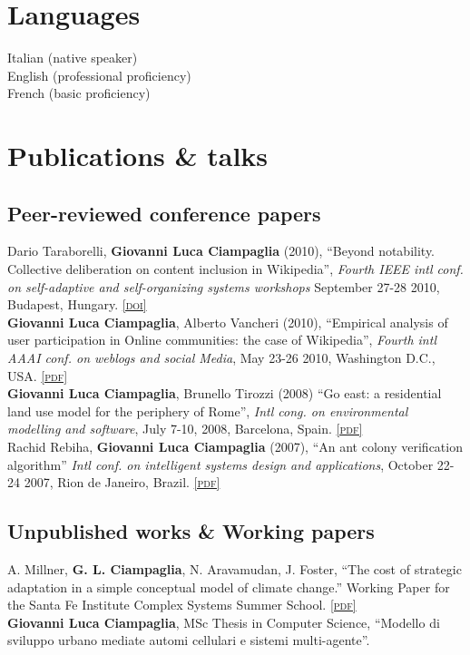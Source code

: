 \documentclass[10pt, a4paper]{article}
\newcommand{\pdf}[1]{\href{#1}{\scriptsize\textsc{[pdf]}}}
\newcommand{\doi}[1]{\href{#1}{\scriptsize\textsc{[doi]}}}
\newcommand{\years}[1]{\marginnote{\scriptsize #1}}
\begin{document}
\section*{Languages}
Italian (native speaker)\\
English (professional proficiency)\\
French (basic proficiency)

\section*{Publications \& talks}

\subsection*{Peer-reviewed conference papers}
\noindent
\years{2010b}Dario Taraborelli, \textbf{Giovanni Luca Ciampaglia} (2010), ``Beyond notability. Collective deliberation on content inclusion in Wikipedia'', \emph{Fourth IEEE intl conf. on self-adaptive and self-organizing systems workshops} September 27-28 2010, Budapest, Hungary. \doi{10.1109/SASOW.2010.26}\\
\years{2010a}\textbf{Giovanni Luca Ciampaglia}, Alberto Vancheri (2010), ``Empirical analysis of user participation in Online communities: the case of Wikipedia'', \emph{Fourth intl AAAI conf. on weblogs and social Media}, May 23-26 2010, Washington D.C., USA. \pdf{http://www.aaai.org/ocs/index.php/ICWSM/ICWSM10/paper/download/1517/1861}\\ 
\years{2008}\textbf{Giovanni Luca Ciampaglia}, Brunello Tirozzi (2008) ``Go east: a residential land use model for the periphery of Rome'', \emph{Intl cong. on environmental modelling and software}, July 7-10, 2008, Barcelona, Spain. \pdf{http://www.inf.usi.ch/phd/ciampaglia/papers/RomeModel2008.pdf}\\
\years{2007}Rachid Rebiha, \textbf{Giovanni Luca Ciampaglia} (2007), ``An ant colony verification algorithm'' \emph{Intl conf. on intelligent systems design and applications}, October 22-24 2007, Rion de Janeiro, Brazil. \pdf{http://www.inf.usi.ch/phd/ciampaglia/papers/RebihaACOVerification07.pdf}\\

\subsection*{Unpublished works \& Working papers}
\noindent
\years{2008}A. Millner, \textbf{G. L. Ciampaglia}, N. Aravamudan, J. Foster, ``The cost of strategic adaptation in a simple conceptual model of climate change.'' Working Paper for the Santa Fe Institute Complex Systems Summer School. \pdf{http://www.santafe.edu/events/workshops/images/3/32/Simpleclimatechange.pdf}\\
\years{2006}\textbf{Giovanni Luca Ciampaglia}, MSc Thesis in Computer Science, ``Modello di sviluppo urbano mediate automi cellulari e sistemi multi-agente''.\\
\end{document}
